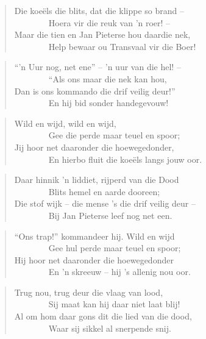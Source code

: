 \begin{verse}
Die koe\"els die blits, dat die klippe so brand -- \\ 
\ \ \ \ \ \ \ \ Hoera vir die reuk van ’n roer! -- \\ 
Maar die tien en Jan Pieterse hou daardie nek, \\
\ \ \ \ \ \ \ \ Help bewaar ou Transvaal vir die Boer! \\
\end{verse}

\begin{verse}
``’n Uur nog, net ene'' -- ’n uur van die hel! --  \\
\ \ \ \ \ \ \ \ ``Als ons maar die nek kan hou, \\
Dan is ons kommando die drif veilig deur!'' \\
\ \ \ \ \ \ \ \ En hij bid sonder handegevouw! \\
\end{verse}

\begin{verse}
Wild en wijd, wild en wijd, \\ 
\ \ \ \ \ \ \ \ Gee die perde maar teuel en spoor; \\ 
Jij hoor net daaronder die hoewegedonder, \\ 
\ \ \ \ \ \ \ \ En hierbo fluit die koe\"els langs jouw oor. \\ 
\end{verse}

\begin{verse}
Daar hinnik ’n liddiet, rijperd van die Dood \\ 
\ \ \ \ \ \ \ \ Blits hemel en aarde dooreen; \\ 
Die stof wijk -- die mense ’s die drif veilig deur --  \\ 
\ \ \ \ \ \ \ \ Bij Jan Pieterse leef nog net een. \\ 
\end{verse}

\begin{verse}
``Ons trap!'' kommandeer hij. Wild en wijd \\ 
\ \ \ \ \ \ \ \ Gee hul perde maar teuel en spoor; \\ 
Hij hoor net daaronder die hoewegedonder \\ 
\ \ \ \ \ \ \ \ En ’n skreeuw -- hij ’s allenig nou oor. \\ 
\end{verse}

\begin{verse}
Trug nou, trug deur die vlaag van lood, \\ 
\ \ \ \ \ \ \ \ Sij maat kan hij daar niet laat blij! \\ 
Al om hom daar gons dit die lied van die dood, \\ 
\ \ \ \ \ \ \ \ Waar sij sikkel al snerpende snij. \\ 
\end{verse}


